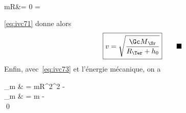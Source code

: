 \documentclass[a4paper, 10pt, final, garamond]{book}
\begin{document}
{\begin{isd}[righthand ratio=.4]
\begin{DispWithArrows}
			\\
			mR\tpp &= 0
			\Lra
			\tp = \cte
			\label{eq:ivc72}
		\end{DispWithArrows}
		\eqref{eq:ivc71} donne alors
		\begin{equation}
			\boxed{v = \sqrt{\frac{\Gc M{_\Sr}}{R_{\Ter}+h_0}}}
			\rlap{$\qquad\blacksquare$}
			\label{eq:ivc73}
		\end{equation}
		\tcblower
		Enfin, avec~\eqref{eq:ivc73} et l'énergie mécanique, on a
		\begin{DispWithArrows*}[fleqn, mathindent=0pt]
			\Ec_m         & =
			mR^2\tp^2 - \Gc{}
			\\\Lra
			\Ec_m         & = m - \Gc{}
			\\\Lra
			\qed
		\end{DispWithArrows*}
	\end{isd}
}
\end{document}
